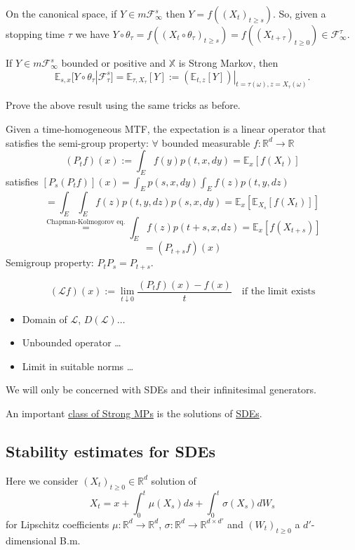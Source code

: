 \begin{remark}
    On the canonical space, if $Y \in m\mathcal{F}_\infty^s$ then $Y = f((X_t)_{t \ge s})$. So, given a stopping time $\tau$ we have $Y \circ \theta_\tau = f((X_t \circ \theta_\tau)_{t \ge s}) = f((X_{t+\tau})_{t \ge 0}) \in \mathcal{F}_\infty^\tau$.
\end{remark}

\begin{proposition}
    If $Y \in m\mathcal{F}_\infty^s$ bounded or positive and $\mathbb{X}$ is Strong Markov, then
    $$\mathbb{E}_{s,x}[Y \circ \theta_\tau | \mathcal{F}_\tau^s] = \mathbb{E}_{\tau, X_\tau}[Y] := (\mathbb{E}_{t,z}[Y])|_{t=\tau(\omega), z=X_\tau(\omega)}.$$
\end{proposition}

\begin{homework}
    Prove the above result using the same tricks as before.
\end{homework}

Given a time-homogeneous MTF, the expectation is a linear operator that satisfies the semi-group property:
$\forall$ bounded measurable $f: \mathbb{R}^d \to \mathbb{R}$
$$(P_t f)(x) := \int_E f(y)p(t,x,dy) = \mathbb{E}_x[f(X_t)]$$
satisfies $[P_s(P_t f)](x) = \int_E p(s,x,dy) \int_E f(z)p(t,y,dz)$
$$= \int_E \int_E f(z)p(t,y,dz)p(s,x,dy) = \mathbb{E}_x[\mathbb{E}_{X_s}[f(X_t)]]$$
$$\overset{\text{Chapman-Kolmogorov eq.}}{=} \int_E f(z)p(t+s, x, dz) = \mathbb{E}_x[f(X_{t+s})]$$
$$= (P_{t+s} f)(x)$$
Semigroup property: $P_t P_s = P_{t+s}$.

$$(\mathcal{L}f)(x) := \lim_{t \downarrow 0} \frac{(P_t f)(x) - f(x)}{t} \quad \text{if the limit exists}$$
\begin{itemize}
    \item Domain of $\mathcal{L}$, $D(\mathcal{L}) \dots$
    \item Unbounded operator \dots
    \item Limit in suitable norms \dots
\end{itemize}
We will only be concerned with SDEs and their infinitesimal generators.

An important \underline{class of Strong MPs} is the solutions of \underline{SDEs}.

\subsection*{Stability estimates for SDEs}

Here we consider $(X_t)_{t \ge 0} \in \mathbb{R}^d$ solution of
$$X_t = x + \int_0^t \mu(X_s)ds + \int_0^t \sigma(X_s)dW_s$$
for Lipschitz coefficients $\mu: \mathbb{R}^d \to \mathbb{R}^d$, $\sigma: \mathbb{R}^d \to \mathbb{R}^{d \times d'}$ and $(W_t)_{t \ge 0}$ a $d'$-dimensional B.m.

